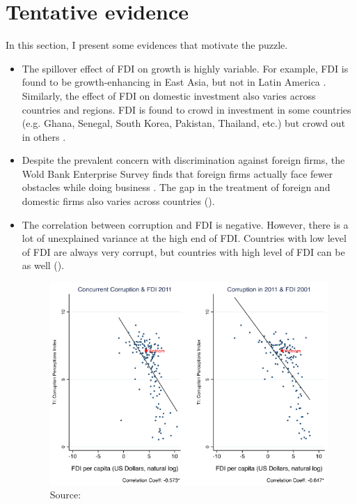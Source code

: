 \documentclass[12pt]{article}
\begin{document}
\section{Tentative evidence}

In this section, I present some evidences that motivate the puzzle.

\begin{itemize}
	\item The spillover effect of FDI on growth is highly variable. For example, FDI is found to be growth-enhancing in East Asia, but not in Latin America \citep{Zhang2001}. Similarly, the effect of FDI on domestic investment also varies across countries and regions. FDI is found to crowd in investment in some countries (e.g. Ghana, Senegal, South Korea, Pakistan, Thailand, etc.) but crowd out in others \citep{Agosin2005}.
	
	\item Despite the prevalent concern with discrimination against foreign firms, the Wold Bank Enterprise Survey finds that foreign firms actually face fewer obstacles while doing business \citep{Batra2003}. The gap in the treatment of foreign and domestic firms also varies across countries ().
	
	\item The correlation between corruption and FDI is negative. However, there is a lot of unexplained variance at the high end of FDI. Countries with low level of FDI are always very corrupt, but countries with high level of FDI can be as well ().
	
	\begin{figure}[!ht]
	\includegraphics[width=\textwidth, height=\textheight,keepaspectratio]{../figure/fdi_corruption}
	\caption{Source: \citep{Malesky2005}}
	\label{fig:fdi_corruption}
	\end{figure}
\end{itemize}
\end{document}
